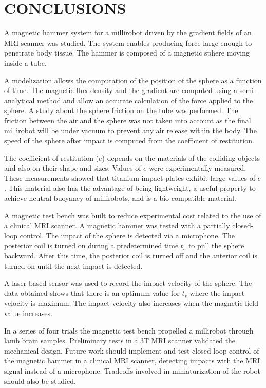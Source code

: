 \documentclass[letterpaper, 10 pt, conference]{ieeeconf}  %
\begin{document}
\section{CONCLUSIONS}
\label{conclusion}
A magnetic hammer system for a millirobot driven by the gradient fields of an MRI scanner was studied. 
The system enables producing force large enough to penetrate body tissue.
The hammer is composed of a magnetic sphere moving inside a tube.\par
A modelization allows the computation of the position of the sphere as a function of time. 
The magnetic flux density and the gradient are computed using a semi-analytical method and allow an accurate calculation of the force applied to the sphere. A study about the sphere friction on the tube was performed. The friction between the air and the sphere was not taken into account as the final millirobot will be under vacuum to prevent any air release within the body.
The speed of the sphere after impact is computed from the coefficient of restitution. \par
The coefficient of restitution ($e$) depends on the materials of the colliding objects and also on their shape and sizes. 
Values of $e$ were experimentally measured. 
These measurements showed that titanium impact plates exhibit large values of $e$. 
This material also has the advantage of being lightweight, a useful property to achieve neutral buoyancy of millirobots, and is a bio-compatible material.\par
A magnetic test bench was built to reduce experimental cost related to the use of a clinical MRI scanner. 
A magnetic hammer was tested with a partially closed-loop control. 
The impact of the sphere is detected via a microphone. 
The posterior coil is turned on during a predetermined time $t_s$ to pull the sphere backward.
 After this time, the posterior coil is turned off and the anterior coil is turned on until the next impact is detected.\par
A laser based sensor was used to record the impact velocity of the sphere. The data obtained shows that there is an optimum value for $t_s$ where the impact velocity is maximum. The impact velocity also increases when the magnetic field value increases.\par
	In a series of four trials the magnetic test bench propelled a millirobot through lamb brain samples. Preliminary tests in a 3T MRI scanner validated the mechanical design. Future work should implement and test closed-loop control of the magnetic hammer in a clinical MRI scanner, detecting impacts with the MRI signal instead of a microphone. 
Tradeoffs involved in miniaturization of the robot should also be studied.
\vspace{-1.1em}
 
\end{document}
